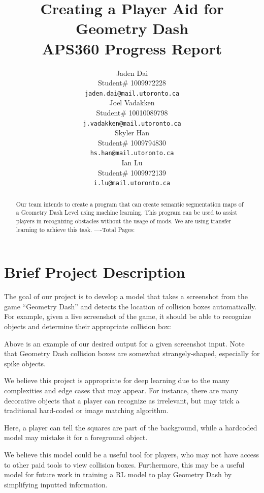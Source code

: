 \documentclass{article} %
\title{Creating a Player Aid for Geometry Dash  \\ 
APS360 Progress Report}
\author{Jaden Dai \\
Student\# 1009972228\\
\texttt{jaden.dai@mail.utoronto.ca} \\
\And
Joel Vadakken  \\
Student\# 10010089798\\
\texttt{j.vadakken@mail.utoronto.ca} \\
\And
Skyler Han  \\
Student\# 1009794830 \\
\texttt{hs.han@mail.utoronto.ca} \\
\AND
Ian Lu  \\
Student\# 1009972139 \\
\texttt{i.lu@mail.utoronto.ca} \\
\AND
}
\begin{document}
\maketitle

\begin{abstract}
Our team intends to create a program that can create semantic segmentation
maps of a Geometry Dash Level using machine learning. This program can be
used to assist players in recognizing obstacles without the usage of mods.
We are using transfer learning to achieve this task.
----Total Pages: \pageref{last_page}
\end{abstract}



\section{Brief Project Description}


The goal of our project is to develop a model that takes a screenshot from the game “Geometry Dash” and detects the location of collision boxes automatically. For example, given a live screenshot of the game, it should be able to recognize objects and determine their appropriate collision box:



Above is an example of our desired output for a given screenshot input. Note that Geometry Dash collision boxes are somewhat strangely-shaped, especially for spike objects.

We believe this project is appropriate for deep learning due to the many complexities and edge cases that may appear. For instance, there are many decorative objects that a player can recognize as irrelevant, but may trick a traditional hard-coded or image matching algorithm.


 
Here, a player can tell the squares are part of the background, while a hardcoded model may mistake it for a foreground object.

We believe this model could be a useful tool for players, who may not have access to other paid tools to view collision boxes. Furthermore, this may be a useful model for future work in training a RL model to play Geometry Dash by simplifying inputted information.
\end{document}
